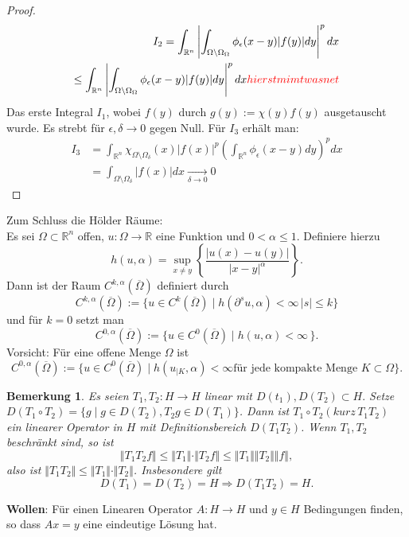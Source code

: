 \documentclass[12pt,titlepage]{article}
\newtheorem{bemerkung}[zahl]{Bemerkung}
\numberwithin{equation}{section}
\begin{document}
\begin{proof}
\begin{align*}
I_2=\int_{\mathbb{R}^n}\left\vert \int_{\Omega\setminus \Omega_{\Omega}} \phi_{\epsilon}(x-y)\vert f(y)\vert dy \right\vert^p dx\\
\leq \int_{\mathbb{R}^n}\left\vert \int_{\Omega\setminus \Omega_{\Omega}} \phi_{\epsilon}(x-y)\vert f(y)\vert dy \right\vert^p dx \textcolor{red}{hier stmimt was net}
\end{align*}
Das erste Integral $I_1$, wobei $f(y)$ durch $g(y):=\chi(y)f(y)$ ausgetauscht wurde. Es strebt  für $\epsilon, \delta \rightarrow 0$ gegen Null. Für $I_3$ erhält man:
\begin{align*}
I_3&=\int_{\mathbb{R}^n}\chi_{\Omega\setminus \Omega_{\delta}}(x)\vert f(x) \vert^p \left(\int_{\mathbb{R}^n}\phi_{\epsilon}(x-y)dy\right)^pdx\\
&=\int_{\Omega\setminus \Omega_{\delta}}\vert f(x) \vert dx \underset{\delta\rightarrow 0}{\rightarrow}0
\end{align*}
\end{proof}
Zum Schluss die Hölder Räume:\\
Es sei $\Omega \subset \mathbb{R}^n$ offen, $u:\Omega\to \mathbb{R}$ eine Funktion und $0< \alpha \leq 1$. Definiere hierzu 
\[
h(u,\alpha)=\underset{x\neq y}{\sup}\left\lbrace \frac{\vert u(x)-u(y)\vert}{{\vert x-y \vert }^{\alpha}}\right\rbrace.
\] Dann ist der Raum $C^{k,\alpha}(\overline{\Omega})$ definiert durch 
\[
C^{k,\alpha}(\overline{\Omega}):=\{u \in C^k(\overline{\Omega})\mid h(\partial^su, \alpha)<\infty \, \vert s\vert \leq k\}
\]und für $k=0$ setzt man 
\[
C^{0,\alpha}(\overline{\Omega}):=\{u \in C^0(\overline{\Omega})\mid h(u, \alpha)<\infty \, \}.
\]Vorsicht: Für eine offene Menge $\Omega$ ist 
\[C^{0,\alpha}(\overline{\Omega}):=\{u \in C^0(\overline{\Omega})\mid h(u_{|K}, \alpha)<\infty \text{für jede kompakte Menge }K\subset \Omega  \}.
\]
\begin{bemerkung}
Es seien $T_1,T_2:H \to H$ linear mit $D(t_1),D(T_2) \subset H.$ Setze $D(T_1\circ T_2)=\{g \mid g \in D(T_2),T_2g \in D(T_1)\}$. Dann ist $T_1 \circ T_2(kurz \, T_1T_2)$ ein linearer Operator in $H$ mit Definitionsbereich $D(T_1T_2)$. Wenn $T_1,T_2$ beschränkt sind, so ist 
\[
\Vert T_1 T_2 f \Vert \leq \Vert T_1 \Vert \cdot\Vert T_2 f \Vert\leq \Vert T_1 \Vert \Vert  T_2 \Vert \Vert f \Vert,
\]also ist $\Vert T_1 T_2 \Vert \leq \Vert T_1 \Vert \cdot \Vert T_2 \Vert $. Insbesondere gilt
\[
D(T_1)=D(T_2)=H \Rightarrow D(T_1T_2)=H.
\]
\end{bemerkung}
\textbf{Wollen}: Für einen Linearen Operator $A:H \to H$ und $y \in H$ Bedingungen finden, so dass $Ax=y$ eine eindeutige Lösung hat.\\
\end{document}

